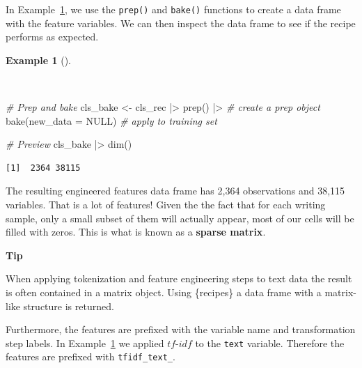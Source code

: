 \documentclass[
  letterpaper,
  krantz1]{latex/krantz-mod}
\newenvironment{Shaded}{\begin{snugshade}}{\end{snugshade}}
\newcommand{\AttributeTok}[1]{\textcolor[rgb]{0.00,0.00,0.00}{#1}}
\newcommand{\CommentTok}[1]{\textcolor[rgb]{0.00,0.00,0.00}{\textit{#1}}}
\newcommand{\ConstantTok}[1]{\textcolor[rgb]{0.00,0.00,0.00}{#1}}
\newcommand{\FunctionTok}[1]{\textcolor[rgb]{0.00,0.00,0.00}{#1}}
\newcommand{\NormalTok}[1]{\textcolor[rgb]{0.00,0.00,0.00}{#1}}
\newcommand{\OtherTok}[1]{\textcolor[rgb]{0.00,0.00,0.00}{#1}}
\newcommand{\SpecialCharTok}[1]{\textcolor[rgb]{0.00,0.00,0.00}{#1}}
\theoremstyle{definition}
\newtheorem{example}{Example}[chapter]
\theoremstyle{definition}
\theoremstyle{remark}
\begin{document}
In Example~\ref{exm-predict-class-recipe-prep}, we use the
\texttt{prep()} and \texttt{bake()} functions to create a data frame
with the feature variables. We can then inspect the data frame to see if
the recipe performs as expected.

\begin{example}[]\protect\hypertarget{exm-predict-class-recipe-prep}{}\label{exm-predict-class-recipe-prep}

~

\begin{Shaded}
\begin{Highlighting}[numbers=left,,]
\CommentTok{\# Prep and bake}
\NormalTok{cls\_bake }\OtherTok{\textless{}{-}}
\NormalTok{  cls\_rec }\SpecialCharTok{|\textgreater{}}
  \FunctionTok{prep}\NormalTok{() }\SpecialCharTok{|\textgreater{}} \CommentTok{\# create a prep object}
  \FunctionTok{bake}\NormalTok{(}\AttributeTok{new\_data =} \ConstantTok{NULL}\NormalTok{) }\CommentTok{\# apply to training set}

\CommentTok{\# Preview}
\NormalTok{cls\_bake }\SpecialCharTok{|\textgreater{}} \FunctionTok{dim}\NormalTok{()}
\end{Highlighting}
\end{Shaded}

\begin{verbatim}
[1]  2364 38115
\end{verbatim}

\end{example}

The resulting engineered features data frame has 2,364 observations and
38,115 variables. That is a lot of features! Given the the fact that for
each writing sample, only a small subset of them will actually appear,
most of our cells will be filled with zeros. This is what is known as a
\textbf{sparse matrix}.

\begin{tcolorbox}[enhanced jigsaw, leftrule=.75mm, colframe=quarto-callout-color-frame, left=2mm, colback=white, toprule=.15mm, breakable, arc=.35mm, opacityback=0, bottomrule=.15mm, rightrule=.15mm]

\textbf{ Tip}

When applying tokenization and feature engineering steps to text data
the result is often contained in a matrix object. Using \{recipes\} a
data frame with a matrix-like structure is returned.

Furthermore, the features are prefixed with the variable name and
transformation step labels. In
Example~\ref{exm-predict-class-recipe-prep} we applied \(tf\)-\(idf\) to
the \texttt{text} variable. Therefore the features are prefixed with
\texttt{tfidf\_text\_}.

\end{tcolorbox}
\end{document}
